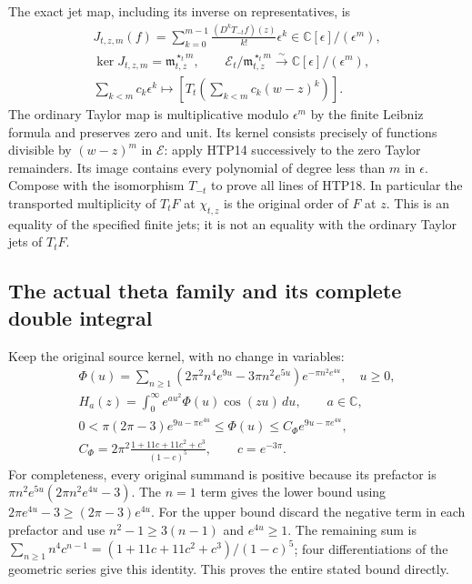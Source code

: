 The exact jet map, including its inverse on representatives, is
\begin{equation}\tag{HTP18}
\begin{gathered}
 J_{t,z,m}(f)=\sum_{k=0}^{m-1}
       \frac{(D^kT_{-t}f)(z)}{k!}\epsilon^k
           \in\mathbb C[\epsilon]/(\epsilon^m),\\
 \ker J_{t,z,m}=\mathfrak m_{t,z}^{\star_t m},\qquad
 \mathcal E_t/\mathfrak m_{t,z}^{\star_t m}
                \overset{\sim}{\longrightarrow}
                   \mathbb C[\epsilon]/(\epsilon^m),\\
 \sum_{k<m}c_k\epsilon^k\longmapsto
       \left[T_t\left(\sum_{k<m}c_k(w-z)^k\right)\right].
\end{gathered}
\end{equation}
The ordinary Taylor map is multiplicative modulo
$\epsilon^m$ by the finite Leibniz formula and preserves
zero and unit. Its kernel consists precisely of functions
divisible by $(w-z)^m$ in $\mathcal E$: apply HTP14
successively to the zero Taylor remainders. Its image contains
every polynomial of degree less than $m$ in $\epsilon$.
Compose with the isomorphism $T_{-t}$ to prove all lines of
HTP18. In particular the transported multiplicity of $T_tF$
at $\chi_{t,z}$ is the original order of $F$ at $z$.
This is an equality of the specified finite jets; it is not
an equality with the ordinary Taylor jets of $T_tF$.

\subsection{The actual theta family and its complete double integral}

Keep the original source kernel, with no change in variables:
\begin{equation}\tag{HTP19}
\begin{gathered}
 \Phi(u)=\sum_{n\ge1}
       (2\pi^2n^4e^{9u}-3\pi n^2e^{5u})e^{-\pi n^2e^{4u}},
 \quad u\ge0,\\
 H_a(z)=\int_0^\infty e^{au^2}\Phi(u)\cos(zu)\,du,\qquad a\in\mathbb C,\\
 0<\pi(2\pi-3)e^{9u-\pi e^{4u}}
       \le\Phi(u)\le C_\Phi e^{9u-\pi e^{4u}},\\
 C_\Phi=2\pi^2\frac{1+11c+11c^2+c^3}{(1-c)^5},\qquad c=e^{-3\pi}.
\end{gathered}
\end{equation}
For completeness, every original summand is positive because
its prefactor is $\pi n^2e^{5u}(2\pi n^2e^{4u}-3)$.
The $n=1$ term gives the lower bound using
$2\pi e^{4u}-3\ge(2\pi-3)e^{4u}$.
For the upper bound discard the negative term in each
prefactor and use $n^2-1\ge3(n-1)$ and $e^{4u}\ge1$.
The remaining sum is
$\sum_{n\ge1}n^4c^{n-1}=(1+11c+11c^2+c^3)/(1-c)^5$;
four differentiations of the geometric series give this
identity. This proves the entire stated bound directly.

